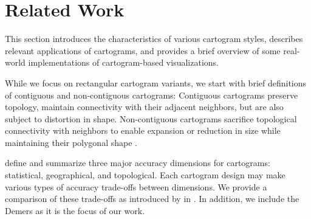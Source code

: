 \section{Related Work}
\label{sec:RelatedWork}

This section introduces the characteristics of various cartogram styles, describes relevant applications of cartograms, and provides a brief overview of some real-world implementations of cartogram-based visualizations.

While we focus on rectangular cartogram variants, we start with brief definitions of contiguous and non-contiguous cartograms: Contiguous cartograms preserve topology, maintain connectivity with their adjacent neighbors, but are also subject to distortion in shape. Non-contiguous cartograms sacrifice topological connectivity with neighbors to enable expansion or reduction in size while maintaining their polygonal shape \cite{dent2009Cartography}.

\citet{nusrat2016State} define and summarize three major accuracy dimensions for cartograms: statistical, geographical, and topological. Each cartogram design may make various types of accuracy trade-offs between dimensions. We provide a comparison of these trade-offs as introduced by \citet{nusrat2016State} in . In addition, we include the Demers as it is the focus of our work.

